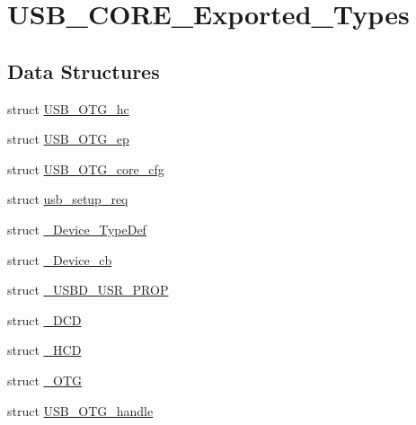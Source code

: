 \hypertarget{group___u_s_b___c_o_r_e___exported___types}{\section{U\-S\-B\-\_\-\-C\-O\-R\-E\-\_\-\-Exported\-\_\-\-Types}
\label{group___u_s_b___c_o_r_e___exported___types}
}
\subsection*{Data Structures}
\begin{DoxyCompactItemize}
\item 
struct \hyperlink{struct_u_s_b___o_t_g__hc}{U\-S\-B\-\_\-\-O\-T\-G\-\_\-hc}
\item 
struct \hyperlink{struct_u_s_b___o_t_g__ep}{U\-S\-B\-\_\-\-O\-T\-G\-\_\-ep}
\item 
struct \hyperlink{struct_u_s_b___o_t_g__core__cfg}{U\-S\-B\-\_\-\-O\-T\-G\-\_\-core\-\_\-cfg}
\item 
struct \hyperlink{structusb__setup__req}{usb\-\_\-setup\-\_\-req}
\item 
struct \hyperlink{struct___device___type_def}{\-\_\-\-Device\-\_\-\-Type\-Def}
\item 
struct \hyperlink{struct___device__cb}{\-\_\-\-Device\-\_\-cb}
\item 
struct \hyperlink{struct___u_s_b_d___u_s_r___p_r_o_p}{\-\_\-\-U\-S\-B\-D\-\_\-\-U\-S\-R\-\_\-\-P\-R\-O\-P}
\item 
struct \hyperlink{struct___d_c_d}{\-\_\-\-D\-C\-D}
\item 
struct \hyperlink{struct___h_c_d}{\-\_\-\-H\-C\-D}
\item 
struct \hyperlink{struct___o_t_g}{\-\_\-\-O\-T\-G}
\item 
struct \hyperlink{struct_u_s_b___o_t_g__handle}{U\-S\-B\-\_\-\-O\-T\-G\-\_\-handle}
\end{DoxyCompactItemize}
